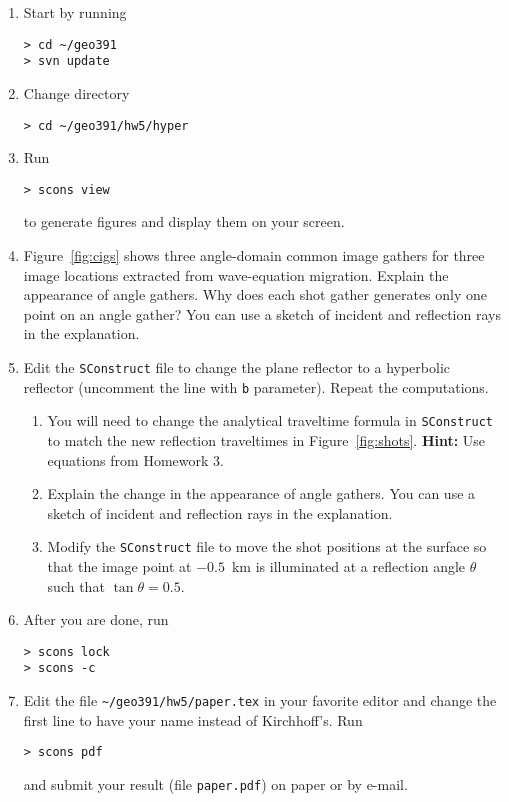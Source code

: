\begin{enumerate}

\item Start by running
\begin{verbatim}
> cd ~/geo391
> svn update
\end{verbatim}
    
\item Change directory 
\begin{verbatim}
> cd ~/geo391/hw5/hyper
\end{verbatim}
\item Run
\begin{verbatim}
> scons view
\end{verbatim}
to generate figures and display them on your screen.  

\item

Figure~\ref{fig:cigs} shows three angle-domain common image gathers
for three image locations extracted from wave-equation migration.
Explain the appearance of angle gathers.  Why does each shot gather
generates only one point on an angle gather? You can use a sketch of
incident and reflection rays in the explanation.


\item Edit the \texttt{SConstruct} file to change the plane reflector
  to a hyperbolic reflector (uncomment the line with \texttt{b}
  parameter). Repeat the computations.

\begin{enumerate}
\item You will need to change the analytical traveltime formula in
  \texttt{SConstruct} to match the new reflection traveltimes in
  Figure~\ref{fig:shots}.  \textbf{Hint:} Use equations from Homework
  3.
\item Explain the change in the appearance of angle gathers. You can
  use a sketch of incident and reflection rays in the explanation. 
\item Modify the \texttt{SConstruct} file to move the shot positions
  at the surface so that the image point at $-0.5$~km is illuminated at
  a reflection angle $\theta$ such that $\tan{\theta}=0.5$.
\end{enumerate}

\item After you are done, run
\begin{verbatim}
> scons lock 
> scons -c
\end{verbatim}

\item Edit the file
  \verb#~/geo391/hw5/paper.tex# in your favorite editor and change the
first line to have your name instead of Kirchhoff's. Run
\begin{verbatim}
> scons pdf
\end{verbatim}
and submit your result (file \texttt{paper.pdf}) on paper or by
e-mail.

\end{enumerate}

{\tiny
{}
}
